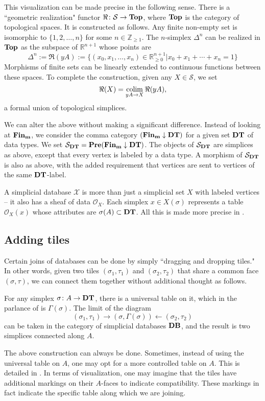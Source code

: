 \documentclass{amsart}
\def\tn{\textnormal}
\def\mc{\mathcal}
\def\ZZ{{\mathbb Z}}
\def\RR{{\mathbb R}}
\def\to{\rightarrow}
\def\from{\leftarrow}
\def\taking{\colon}
\def\ss{\subset}
\def\down{\downarrow}
\def\Top{{\bf Top}}
\def\Pre{{\bf Pre}}
\def\colim{\mathop{\tn{colim}}}
\def\mcO{\mc{O}}
\def\mcS{\mc{S}}
\def\mcX{\mc{X}}
\theoremstyle{remark}
\theoremstyle{definition}
\def\Finm{{\bf Fin_{m}}}
\def\DT{{\bf DT}}
\def\DB{{\bf DB}}
\begin{document}
This visualization can be made precise in the following sense.  There is a ``geometric realization" functor $\Re\taking\mcS\to\Top$, where $\Top$ is the category of topological spaces.  It is constructed as follows.  Any finite non-empty set is isomorphic to $\{1,2,\ldots,n\}$ for some $n\in\ZZ_{\geq 1}$.  The $n$-simplex $\Delta^n$ can be realized in $\Top$ as the subspace of $\RR^{n+1}$ whose points are $$\Delta^n:=\Re(yA):=\{(x_0,x_1,\ldots,x_n)\in\RR^{n+1}_{\geq 0}|x_0+x_1+\cdots+x_n=1\}$$  Morphisms of finite sets can be linearly extended to continuous functions between these spaces.  To complete the construction, given any $X\in\mcS$, we set $$\Re(X)=\colim_{yA\to X}\Re(yA),$$ a formal union of topological simplices.

We can alter the above without making a significant difference.  Instead of looking at $\Finm$, we consider the comma category $(\Finm\down \DT)$ for a given set $\DT$ of data types.  We set $\mcS_\DT=\Pre(\Finm\down\DT)$.  The objects of $\mcS_\DT$ are simplices as above, except that every vertex is labeled by a data type.  A morphism of $\mcS_\DT$ is also as above, with the added requirement that vertices are sent to vertices of the same $\DT$-label.

A simplicial database $\mcX$ is more than just a simplicial set $X$ with labeled vertices -- it also has a sheaf of data $\mcO_X$.  Each simplex $x\in X(\sigma)$ represents a table $\mcO_X(x)$ whose attributes are $\sigma(A)\ss\DT$.  All this is made more precise in \cite{Spi}.

\subsection{Adding tiles}

Certain joins of databases can be done by simply ``dragging and dropping tiles."  In other words, given two tiles $(\sigma_1,\tau_1)$ and $(\sigma_2,\tau_2)$ that share a common face $(\sigma,\tau)$, we can connect them together without additional thought as follows.

For any simplex $\sigma\taking A\to\DT$, there is a universal table on it, which in the parlance of \cite{Spi} is $\Gamma(\sigma)$.  The limit of the diagram $$(\sigma_1,\tau_1)\to(\sigma,\Gamma(\sigma))\from(\sigma_2,\tau_2)$$ can be taken in the category of simplicial databases $\DB$, and the result is two simplices connected along $A$.

The above construction can always be done.  Sometimes, instead of using the universal table on $A$, one may opt for a more controlled table on $A$.  This is detailed in \cite{Spi}.  In terms of visualization, one may imagine that the tiles have additional markings on their $A$-faces to indicate compatibility.  These markings in fact indicate the specific table along which we are joining.
\end{document}
